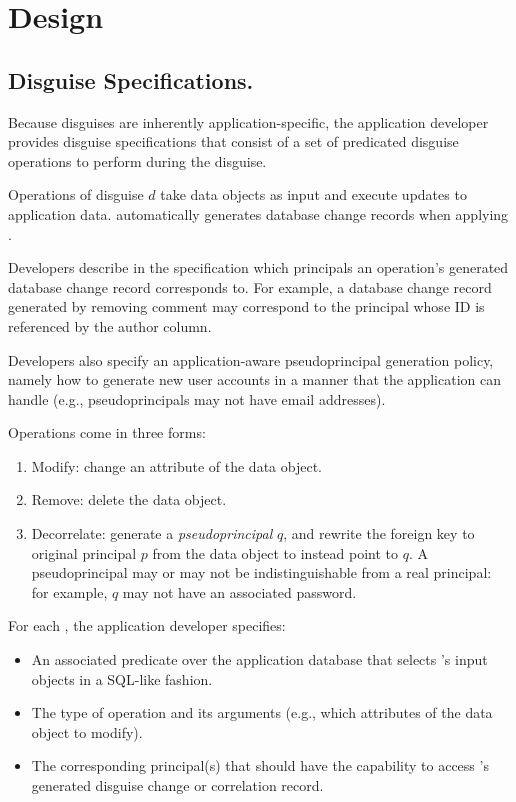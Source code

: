 \section{Design} 

\subsection{Disguise Specifications.} 
Because disguises are inherently application-specific, the application developer provides disguise
specifications that consist of a set of predicated disguise operations  to perform during the
disguise.

Operations  of disguise $d$ take data objects as input and execute updates to application
data.  \sys automatically generates database change records when applying . 

Developers describe in the specification which principals an operation's generated database change
record corresponds to.  For example, a database change record generated by removing comment may
correspond to the principal whose ID is referenced by the author column.  

Developers also specify an application-aware pseudoprincipal generation policy, namely how to
generate new user accounts in a manner that the application can handle (e.g., pseudoprincipals may
not have email addresses).

\vspace{6pt}\noindent
Operations come in three forms:
\begin{enumerate}
    \item Modify: change an attribute of the data object.
    \item Remove: delete the data object.
    \item Decorrelate: generate a \emph{pseudoprincipal} $q$, and rewrite the foreign key to original
        principal $p$ from the data object to instead point to $q$.
        A pseudoprincipal may or may not be indistinguishable from a real principal: for example,
        $q$ may not have an associated password.
\end{enumerate}

\noindent For each , the application developer specifies:
\begin{itemize}
    \item An associated predicate over the application database that selects 's input
        objects in a SQL-like fashion.
    \item The type of operation and its arguments (e.g., which attributes of the data object to
        modify).
    \item The corresponding principal(s) that should have the capability to access 's
        generated disguise change or correlation record.
\end{itemize}

